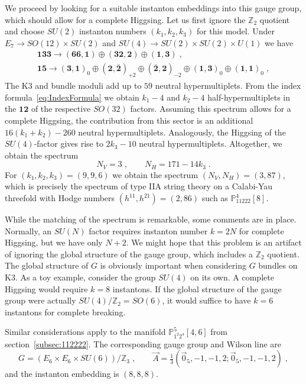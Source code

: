 \documentclass[11pt,a4paper]{article}
\numberwithin{equation}{section}
\numberwithin{table}{section}\setlength{\multlinegap}{25pt}
\begin{document}
We proceed by looking for a suitable instanton embeddings into this gauge group, which should allow for a complete Higgsing. Let us first ignore the $\mathbb{Z}_2$ quotient and choose $SU(2)$ instanton numbers $(k_1,k_2,k_3)$ for this model. Under $E_7\to SO(12)\times SU(2)$ and $SU(4)\to SU(2)\times SU(2)\times U(1)$ we have
\begin{equation}
    \begin{gathered}
        \mathbf{133}\to (\mathbf{66},\mathbf{1})\oplus (\mathbf{32},\mathbf{2})\oplus(\mathbf{1},\mathbf{3})\;,\\
        \mathbf{15}\to(\mathbf{3},\mathbf{1})_0\oplus(\mathbf{2},\bar{\mathbf{2}})_{+2}\oplus(\bar{\mathbf{2}},\mathbf{2})_{-2}\oplus(\mathbf{1},\mathbf{3})_0\oplus(\mathbf{1},\mathbf{1})_0\;,
    \end{gathered}
\end{equation}
The K3 and bundle moduli add up to $59$ neutral hypermultiplets. From the index formula~\eqref{eq:IndexFormula} we obtain $k_1-4$ and $k_2-4$ half-hypermultiplets in the $\mathbf{12}$ of the respective $SO(32)$ factors. Assuming this spectrum allows for a complete Higgsing, the contribution from this sector is an additional $16(k_1+k_2)-260$ neutral hypermultiplets. Analogously, the Higgsing of the $SU(4)$-factor gives rise to $2k_3-10$ neutral hypermultiplets. Altogether, we obtain the spectrum
\begin{equation}
    N_V=3\;,\qquad N_H=171-14k_3\;.
\end{equation}
For $(k_1,k_2,k_3)=(9,9,6)$ we obtain the spectrum $(N_V,N_H)=(3,87)$, which is precisely the spectrum of type IIA string theory on a Calabi-Yau threefold with Hodge numbers $(h^{11},h^{21})=(2,86)$ such as $\mathbb{P}^4_{11222}[8]$.

While the matching of the spectrum is remarkable, some comments are in place. Normally, an $SU(N)$ factor requires instanton number $k=2N$ for complete Higgsing, but we have only $N+2$. We might hope that this problem is an artifact of ignoring the global structure of the gauge group, which includes a $\mathbb{Z}_2$ quotient. The global structure of $G$ is obviously important when considering $G$ bundles on K3. As a toy example, consider the group $SU(4)$ on its own. A complete Higgsing would require $k=8$ instantons. If the global structure of the gauge group were actually $SU(4)/\mathbb{Z}_2=SO(6)$, it would suffice to have $k=6$ instantons for complete breaking.

Similar considerations apply to the manifold $\mathbb{P}^5_{1^2 2^4}[4,6]$ from section~\ref{subsec:112222}. The corresponding gauge group and Wilson line are
\begin{equation}
        G=\left(E_6\times E_6\times SU(6)\right)/\mathbb{Z}_3\;,\qquad  \vec{A}=\tfrac13\left(\vec{0}_5,-1,-1,2;\vec{0}_5,-1,-1,2\right)\;,
\end{equation}
and the instanton embedding is $(8,8,8)$.


  
\end{document}
